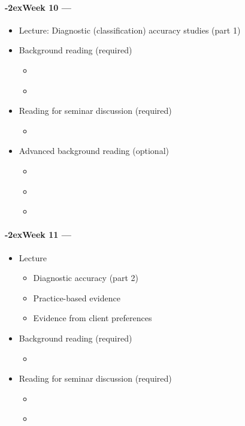 \documentclass[a4paper, 11pt]{article}
\newcommand{\week}[1]{%
  \paragraph*{\kern-2ex\quad #1 --- \syldate{\today}}%


  \ifdim\wd1=\wd\MONDAY
    \AdvanceDate[7]
  \else
    \AdvanceDate[7]
  \fi
}
\begin{document}
\week{Week 10} 
\begin{itemize}
\item Lecture: Diagnostic (classification) accuracy studies (part 1)
\item Background reading (required)
	\begin{itemize}
	\item \citet[chapter 7]{Dollaghan2007a}
	\item \citet{Klee2008a}
	\end{itemize}
\item Reading for seminar discussion (required)
	\begin{itemize}
	\item \citet{Laing2002}
	\end{itemize}
\item Advanced background reading (optional)
	\begin{itemize}
	\item \citet[pp. 69--84]{Ajetunmobi2002}
	\item \citet[pp. 272--278]{Haynes2006}
	\item \citet[pp. 137--167]{Straus2011}
	\end{itemize}
\end{itemize}

\week{Week 11} 
\begin{itemize}
\item Lecture
	\begin{itemize}
	\item Diagnostic accuracy (part 2)
	\item Practice-based evidence
	\item Evidence from client preferences
	\end{itemize}
\item Background reading (required)
	\begin{itemize}
	\item \citet[chapters 9--10]{Dollaghan2007a}
	\end{itemize}
\item Reading for seminar discussion (required)
	\begin{itemize}
	\item \citet{Lemoncello2013}
	\item \citet{Ammerman2014}
	\end{itemize}
\end{itemize}
\end{document}
